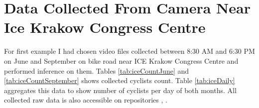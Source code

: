 \section{Data Collected From Camera Near Ice Krakow Congress Centre}
\label{sec:ice}
For first example I had chosen video files collected between 8:30 AM and 6:30 PM on June and September on bike road near ICE Krakow Congress Centre and performed inference on them. Tables \ref{tab:iceCountJune} and \ref{tab:iceCountSeptember} shows collected cyclists count. Table \ref{tab:iceDaily} aggregates this data to show number of cyclists per day of both months. All collected raw data is also accessible on repositories \cite{repo}, \cite{repoSL}.
\begin{table}[H]
\centering
{}
\end{table}

